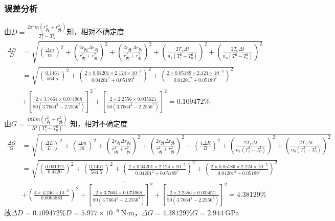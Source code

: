 \documentclass[a4paper]{article}%
\begin{document}
\subsubsection{误差分析}
由$D=\frac{2\pi^2m\left(r_{\text{内}}^2+r_{\text{外}}^2\right)}{T_1^2-T_0^2}$知，相对不确定度
\begin{equation*}
    \begin{aligned}
        \frac{\Delta D}{D}&=\sqrt{
            \left(\frac{\Delta m}{m}\right)^2
            +\left(\frac{2r_{\text{内}}\Delta r_{\text{内}}}{r_{\text{内}}^2+r_{\text{外}}^2}\right)^2
            +\left(\frac{2r_{\text{外}}\Delta r_{\text{外}}}{r_{\text{内}}^2+r_{\text{外}}^2}\right)^2
            +\left(\frac{2T_1\Delta t}{n_1\left(T_1^2-T_0^2\right)}\right)^2
            +\left(\frac{2T_0\Delta t}{n_0\left(T_1^2-T_0^2\right)}\right)^2}\\
        &=\sqrt{
            \left(\frac{0.1461}{564.5}\right)^2
            +\left(\frac{2\times 0.04201\times 2.124\times 10^{-5}}{0.04201^2+0.05189^2}\right)^2
            +\left(\frac{2\times 0.05189\times 2.124\times 10^{-5}}{0.04201^2+0.05189^2}\right)^2}\\
            &\overline{
            +\left[\frac{2\times 3.7664\times 0.074968}{80\left(3.7664^2-2.2556^2\right)}\right]^2
            +\left[\frac{2\times 2.2556\times 0.035621}{50\left(3.7664^2-2.2556^2\right)}\right]^2
            }=0.109472\%
    \end{aligned}
\end{equation*}
由$G=\frac{4\pi Lm\left(r_{\text{内}}^2+r_{\text{外}}^2\right)}{R^4\left(T_1^2-T_0^2\right)}$
知，相对不确定度
\begin{equation*}
    \begin{aligned}
        \frac{\Delta G}{G}&=\sqrt{
            \left(\frac{\Delta L}{L}\right)^2
            +\left(\frac{\Delta m}{m}\right)^2
            +\left(\frac{2r_{\text{内}}\Delta r_{\text{内}}}{r_{\text{内}}^2+r_{\text{外}}^2}\right)^2
            +\left(\frac{2r_{\text{外}}\Delta r_{\text{外}}}{r_{\text{内}}^2+r_{\text{外}}^2}\right)^2
            +\left(\frac{4\Delta R}{R}\right)^2
            +\left(\frac{2T_1\Delta t}{n_1\left(T_1^2-T_0^2\right)}\right)^2
            +\left(\frac{2T_0\Delta t}{n_0\left(T_1^2-T_0^2\right)}\right)^2}\\
        &=\sqrt{
            \left(\frac{0.001021}{0.4420}\right)^2
            +\left(\frac{0.1461}{564.5}\right)^2
            +\left(\frac{2\times 0.04201\times 2.124\times 10^{-5}}{0.04201^2+0.05189^2}\right)^2
            +\left(\frac{2\times 0.05189\times 2.124\times 10^{-5}}{0.04201^2+0.05189^2}\right)^2}\\
            &\overline{
            +\left(\frac{4\times 4.246\times 10^{-6}}{0.0003883}\right)^2
            +\left[\frac{2\times 3.7664\times 0.074968}{80\left(3.7664^2-2.2556^2\right)}\right]^2
            +\left[\frac{2\times 2.2556\times 0.035621}{50\left(3.7664^2-2.2556^2\right)}\right]^2
            }=4.38129\%
    \end{aligned}
\end{equation*}
故$\Delta D=0.109472\%D=5.977\times 10^{-6}~$N$\cdot$m，$\Delta G=4.38129\%G=2.944~$GPa
\end{document}
